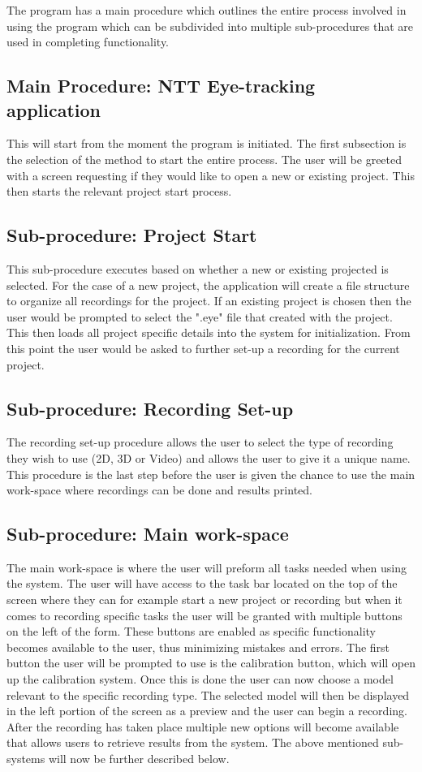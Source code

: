The program has a main procedure which outlines the entire process involved in using the program which can be subdivided into multiple sub-procedures that are used in completing functionality.

\subsection{Main Procedure: NTT Eye-tracking application}
This will start from the moment the program is initiated. The first subsection is the selection of the method to start the entire process. The user will be greeted with a screen requesting if they would like to open a new or existing project. This then starts the relevant project start process.

\subsection{Sub-procedure: Project Start}
This sub-procedure executes based on whether a new or existing projected is selected. For the case of a new project, the application will create a file structure to organize all recordings for the project. If an existing project is chosen then the user would be prompted to select the ".eye" file that created with the project. This then loads all project specific details into the system for initialization. From this point the user would be asked to further set-up a recording for the current project.

\subsection{Sub-procedure: Recording Set-up}
The recording set-up procedure allows the user to select the type of recording they wish to use (2D, 3D or Video) and allows the user to give it a unique name. This procedure is the last step before the user is given the chance to use the main work-space where recordings can be done and results printed.  

\subsection{Sub-procedure: Main work-space}
The main work-space is where the user will preform all tasks needed when using the system. The user will have access to the task bar located on the top of the screen where they can for example start a new project or recording but when it comes to recording specific tasks the user will be granted with multiple buttons on the left of the form. These buttons are enabled as specific functionality becomes available to the user, thus minimizing mistakes and errors. The first button the user will be prompted to use is the calibration button, which will open up the calibration system. Once this is done the user can now choose a model relevant to the specific recording type. The selected model will then be displayed in the left portion of the screen as a preview and the user can begin a recording. After the recording has taken place multiple new options will become available that allows users to retrieve results from the system. The above mentioned sub-systems will now be further described below.


